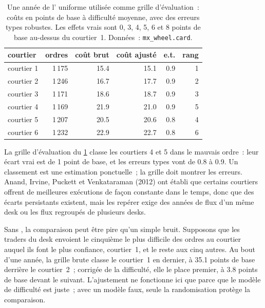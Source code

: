 \begin{table}[ht]
\centering
\small
\begin{tabular}{@{}lrrrrr@{}}
\toprule
courtier & ordres & coût brut & coût ajusté & e.t. & rang \\
\midrule
courtier 1 & 1\,175 & 15.4 & 15.1 & 0.9 & 1 \\
courtier 2 & 1\,246 & 16.7 & 17.7 & 0.9 & 2 \\
courtier 3 & 1\,171 & 18.6 & 18.7 & 0.9 & 3 \\
courtier 4 & 1\,169 & 21.9 & 21.0 & 0.9 & 5 \\
courtier 5 & 1\,207 & 20.5 & 20.6 & 0.8 & 4 \\
courtier 6 & 1\,232 & 22.9 & 22.7 & 0.8 & 6 \\
\bottomrule
\end{tabular}
\caption{Une année de l' uniforme utilisée comme grille d'évaluation~: coûts en points de base à difficulté moyenne, avec des erreurs types robustes. Les effets vrais sont
0, 3, 4, 5, 6 et 8 points de base au-dessus du courtier~1. Données~: \texttt{mx\_wheel.card}.}\label{tab:mx:the-buy-side-trading-desk-and-its-brokers:card}
\end{table}

La grille d'évaluation du \cref{tab:mx:the-buy-side-trading-desk-and-its-brokers:card} classe les courtiers 4 et 5 dans le mauvais ordre~: leur écart vrai est de 1
point de base, et les erreurs types vont de 0.8 à 0.9. Un classement est une estimation ponctuelle~; la grille doit montrer les erreurs. Anand, Irvine, Puckett et
Venkataraman (2012) ont établi que certains courtiers offrent de meilleures exécutions de façon constante dans le temps, donc que des écarts persistants existent, mais les repérer exige
des années de flux d'un même desk ou les flux regroupés de plusieurs desks.

Sans , la comparaison peut être pire qu'un simple bruit. Supposons que les traders du desk envoient le cinquième le plus difficile des ordres au courtier auquel ils font le plus confiance,
courtier~1, et le reste aux cinq autres. Au bout d'une année, la grille brute classe le courtier~1 en dernier, à 35.1 points de base derrière le courtier~2~; corrigée de
la difficulté, elle le place premier, à 3.8 points de base devant le suivant. L'ajustement ne fonctionne ici que parce que le modèle de difficulté est juste~; avec un
modèle faux, seule la randomisation protège la comparaison.

